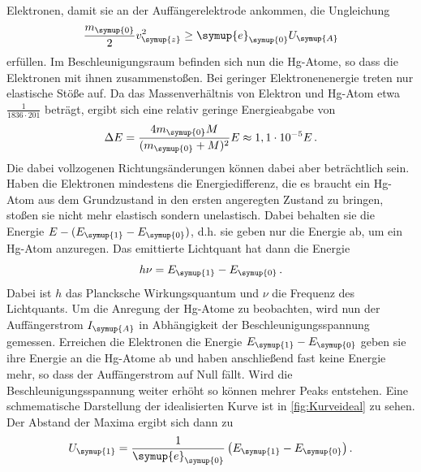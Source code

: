 Elektronen, damit sie an der Auffängerelektrode ankommen, die Ungleichung
\begin{equation}
    \label{eqn:E_Ungleichung}
    \frac{m_{\symup{0}}}{2} v_{\symup{z}}^2 \geq \symup{e}_{\symup{0}} U_{\symup{A}}
\end{equation}
erfüllen. Im Beschleunigungsraum befinden sich nun die Hg-Atome, so dass die Elektronen mit ihnen zusammenstoßen.
Bei geringer Elektronenenergie treten nur elastische Stöße auf. Da das Massenverhältnis von Elektron und Hg-Atom
etwa $\frac{1}{1836 \cdot 201}$ beträgt, ergibt sich eine relativ geringe Energieabgabe von
\begin{equation}
    \label{eqn:EnergieAbgabe}
    \Delta E = \frac{4 m_{\symup{0}} M}{(m_{\symup{0}} + M)^2} E \approx 1,1\cdot 10^{-5} E\,.
\end{equation}
Die dabei vollzogenen Richtungsänderungen können dabei aber beträchtlich sein. Haben die Elektronen mindestens die
Energiedifferenz, die es braucht ein Hg-Atom aus dem Grundzustand in den ersten angeregten Zustand zu bringen,
stoßen sie nicht mehr elastisch sondern unelastisch. Dabei behalten sie die Energie $E - (E_{\symup{1}} - 
E_{\symup{0}})$, d.h. sie geben nur die Energie ab, um ein Hg-Atom anzuregen. Das emittierte Lichtquant hat dann
die Energie
\begin{equation}
    \label{eqn:Emission}
    h\nu = E_{\symup{1}} - E_{\symup{0}}\,.
\end{equation}
Dabei ist $h$ das Plancksche Wirkungsquantum und $\nu$ die Frequenz des Lichtquants.
Um die Anregung der Hg-Atome zu beobachten, wird nun der Auffängerstrom $I_{\symup{A}}$ in Abhängigkeit der
Beschleunigungsspannung gemessen. Erreichen die Elektronen die Energie $E_{\symup{1}} - E_{\symup{0}}$ geben
sie ihre Energie an die Hg-Atome ab und haben anschließend fast keine Energie mehr, so dass der Auffängerstrom
auf Null fällt. Wird die Beschleunigungsspannung weiter erhöht so können mehrer Peaks entstehen. Eine schmematische
Darstellung der idealisierten Kurve ist in \autoref{fig:Kurveideal} zu sehen. Der Abstand der Maxima ergibt sich
dann zu
\begin{equation}
    \label{eqn:Spannung}
    U_{\symup{1}} = \frac{1}{\symup{e}_{\symup{0}}}\left(E_{\symup{1}}-E_{\symup{0}}\right).
\end{equation}
